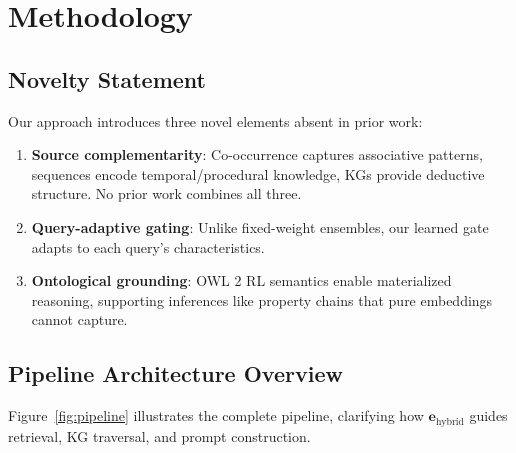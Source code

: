 \documentclass[10pt,twocolumn]{article}
\begin{document}
\section{Methodology}
\label{sec:method}

\subsection{Novelty Statement}
\label{sec:novelty}

Our approach introduces three novel elements absent in prior work:

\begin{enumerate}
    \item \textbf{Source complementarity}: Co-occurrence captures associative patterns, sequences encode temporal/procedural knowledge, KGs provide deductive structure. No prior work combines all three.
    \item \textbf{Query-adaptive gating}: Unlike fixed-weight ensembles, our learned gate adapts to each query's characteristics.
    \item \textbf{Ontological grounding}: OWL 2 RL semantics enable materialized reasoning, supporting inferences like property chains that pure embeddings cannot capture.
\end{enumerate}


\subsection{Pipeline Architecture Overview}
\label{sec:pipeline}

Figure~\ref{fig:pipeline} illustrates the complete pipeline, clarifying how $\mathbf{e}_{\text{hybrid}}$ guides retrieval, KG traversal, and prompt construction.
\end{document}
